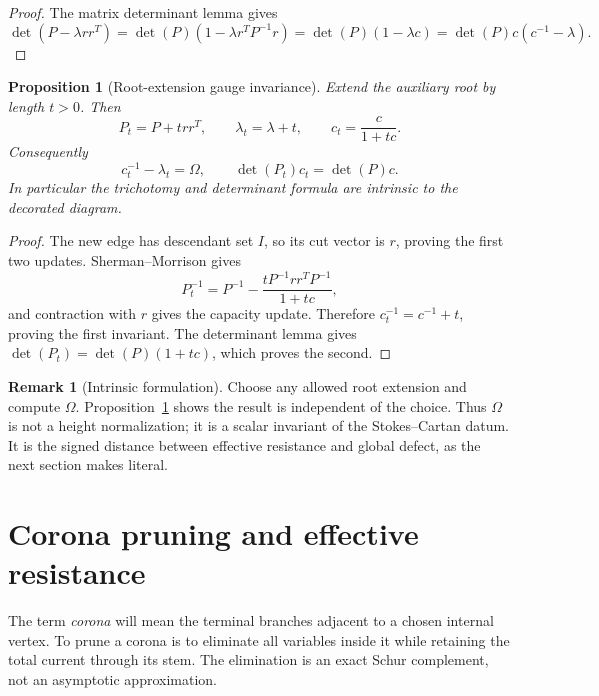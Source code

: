 \documentclass[11pt,a4paper]{amsart}
\theoremstyle{plain}
\newtheorem{proposition}[theorem]{Proposition}
\theoremstyle{definition}
\newtheorem{remark}[theorem]{Remark}
\begin{document}
\begin{proof}
The matrix determinant lemma gives
\[
 \det(P-\lambda rr^T)=\det(P)(1-\lambda r^TP^{-1}r)
 =\det(P)(1-\lambda c)=\det(P)c(c^{-1}-\lambda).
\]
\end{proof}

\begin{proposition}[Root-extension gauge invariance]\label{prop:root-invariance}
Extend the auxiliary root by length $t>0$.  Then
\begin{equation}\label{eq:root-update}
 P_t=P+t rr^T,\qquad \lambda_t=\lambda+t,\qquad
 c_t=\frac{c}{1+tc}.
\end{equation}
Consequently
\begin{equation}\label{eq:root-invariants}
 c_t^{-1}-\lambda_t=\Omega,\qquad
 \det(P_t)c_t=\det(P)c.
\end{equation}
In particular the trichotomy and determinant formula are intrinsic to the decorated diagram.
\end{proposition}

\begin{proof}
The new edge has descendant set $I$, so its cut vector is $r$, proving the first two updates.
Sherman--Morrison gives
\[
 P_t^{-1}=P^{-1}-\frac{tP^{-1}rr^TP^{-1}}{1+tc},
\]
and contraction with $r$ gives the capacity update.  Therefore
$c_t^{-1}=c^{-1}+t$, proving the first invariant.  The determinant lemma gives
$\det(P_t)=\det(P)(1+tc)$, which proves the second.
\end{proof}

\begin{remark}[Intrinsic formulation]
Choose any allowed root extension and compute $\Omega$.  Proposition~\ref{prop:root-invariance}
shows the result is independent of the choice.  Thus $\Omega$ is not a height normalization; it is
a scalar invariant of the Stokes--Cartan datum.  It is the signed distance between effective
resistance and global defect, as the next section makes literal.
\end{remark}

\section{Corona pruning and effective resistance}\label{sec:corona}

The term \emph{corona} will mean the terminal branches adjacent to a chosen internal vertex.  To
prune a corona is to eliminate all variables inside it while retaining the total current through
its stem.  The elimination is an exact Schur complement, not an asymptotic approximation.
\end{document}
